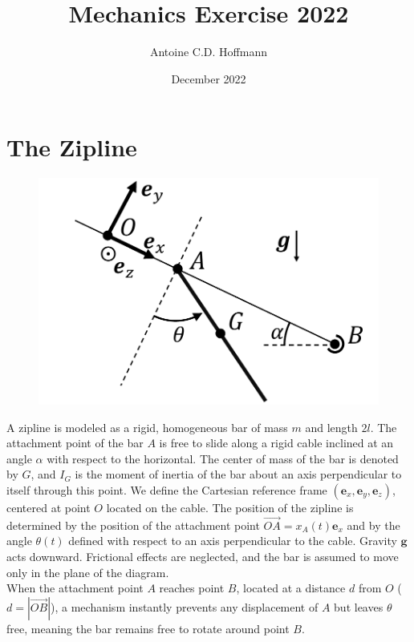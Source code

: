 \documentclass[11pt,a4paper]{exam}
\title{Mechanics Exercise 2022}
\date{December 2022}
\author{Antoine C.D. Hoffmann}
\newcommand{\exACDH}{\bm e_x}
\newcommand{\eyACDH}{\bm e_y}
\newcommand{\ezACDH}{\bm e_z}
\begin{document}
\section*{The Zipline}



\begin{figure}
    \centering
    \includegraphics[width=0.55\linewidth]{ExoFig/tyr_schema.pdf}
\end{figure}
A zipline is modeled as a rigid, homogeneous bar of mass $m$ and length $2l$.
The attachment point of the bar $A$ is free to slide along a rigid cable inclined at an angle $\alpha$ with respect to the horizontal.
The center of mass of the bar is denoted by $G$, and $I_G$ is the moment of inertia of the bar about an axis perpendicular to itself through this point.
We define the Cartesian reference frame $(\exACDH, \eyACDH, \ezACDH)$, centered at point $O$ located on the cable.
The position of the zipline is determined by the position of the attachment point $\overrightarrow{OA}=x_A(t) \exACDH$ and by the angle $\theta(t)$ defined with respect to an axis perpendicular to the cable.
Gravity $\bm g$ acts downward. Frictional effects are neglected, and the bar is assumed to move only in the plane of the diagram.\\
When the attachment point $A$ reaches point $B$, located at a distance $d$ from $O$ ($d=|\overrightarrow{OB}|$), a mechanism instantly prevents any displacement of $A$ but leaves $\theta$ free, meaning the bar remains free to rotate around point $B$.
%
\end{document}
